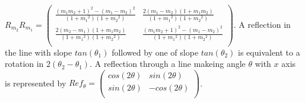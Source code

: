 $R_{m_2} R_{m_1} = 
\left(
\begin{array}{cc}
{\frac {(m_1 m_2 +1)^2 - (m_1 - m_2)^2} {(1+{m_1}^2) (1+{m_2}^2)}} & 
{\frac {2(m_1 - m_2 )(1+ m_1 m_2)} {(1+{m_1}^2) (1+{m_2}^2)}}  \\
{\frac {2(m_2 - m_1 )(1+ m_1 m_2)} {(1+{m_1}^2) (1+{m_2}^2)}} &
{\frac {(m_1 m_2 +1)^2 - (m_1 - m_2)^2} {(1+{m_1}^2) (1+{m_2}^2)}} \\
\end{array}
\right)$.  A reflection in the line with slope $tan(\theta_1)$ followed by one of slope $tan(\theta_2)$ is
equivalent to a rotation in $2(\theta_2 - \theta_1)$. A reflection through a line makeing angle $\theta$ with
$x$ axis is represented by
$Ref_{\theta} =
\left(
\begin{array}{cc}
cos(2\theta) & sin(2\theta) \\
sin(2\theta) & -cos(2\theta) \\
\end{array}
\right)$. \\
